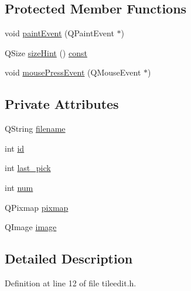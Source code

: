 \subsection*{Protected Member Functions}
\begin{DoxyCompactItemize}
\item 
void \hyperlink{classTilePickerTab_a6e8d27090c6aa12c39c438025cbf08bd}{paint\+Event} (Q\+Paint\+Event $\ast$)
\item 
Q\+Size \hyperlink{classTilePickerTab_ab6e7a2d6cda65e3cf9e7de7a35ba2fce}{size\+Hint} () \hyperlink{tradstdc_8h_a2c212835823e3c54a8ab6d95c652660e}{const} 
\item 
void \hyperlink{classTilePickerTab_a5f937e70bb8e481bc9090228bd3efe2d}{mouse\+Press\+Event} (Q\+Mouse\+Event $\ast$)
\end{DoxyCompactItemize}
\subsection*{Private Attributes}
\begin{DoxyCompactItemize}
\item 
Q\+String \hyperlink{classTilePickerTab_a56a5255e678287a8229b4fc488309567}{filename}
\item 
int \hyperlink{classTilePickerTab_ab8494dd5699dc9f7e6851db4101f2087}{id}
\item 
int \hyperlink{classTilePickerTab_a0ecc501d1b669df84fdeeb37500ce95e}{last\+\_\+pick}
\item 
int \hyperlink{classTilePickerTab_a013d0f727803e49ad17dc56b97376fc6}{num}
\item 
Q\+Pixmap \hyperlink{classTilePickerTab_a40f1352a5c791719b1f2987df3f13c79}{pixmap}
\item 
Q\+Image \hyperlink{classTilePickerTab_ac443b8ad8b35aaa27d855a3513268358}{image}
\end{DoxyCompactItemize}


\subsection{Detailed Description}


Definition at line 12 of file tileedit.\+h.



